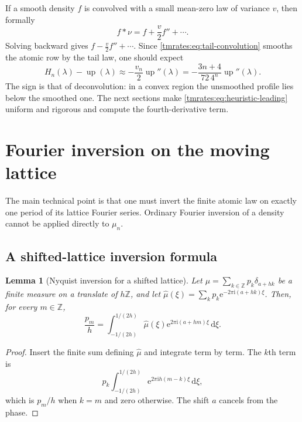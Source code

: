 \documentclass[11pt,oneside]{article}
\newtheorem{lemma}[theorem]{Lemma}
\theoremstyle{definition}
\theoremstyle{remark}
\newcommand{\Z}{\mathbb Z}
\newcommand{\Up}{\operatorname{up}}
\newcommand{\e}{\mathrm e}
\newcommand{\ii}{\mathrm i}
\newcommand{\dd}{\,\mathrm d}
\begin{document}
If a smooth density $f$ is convolved with a small mean-zero law of variance $v$, then formally
\[
 f*\nu=f+\frac v2f''+\cdots.
\]
Solving backward gives $f-\frac v2f''+\cdots$.  Since \eqref{tmrates:eq:tail-convolution} smooths the
atomic row by the tail law, one should expect
\begin{equation}
 H_n(\lambda)-\Up(\lambda)
 \approx-\frac{v_n}{2}\Up''(\lambda)
 =-\frac{3n+4}{72\,4^n}\Up''(\lambda).                    \label{tmrates:eq:heuristic-leading}
\end{equation}
The sign is that of deconvolution: in a convex region the unsmoothed profile lies below the
smoothed one.  The next sections make \eqref{tmrates:eq:heuristic-leading} uniform and rigorous and
compute the fourth-derivative term.

\section{Fourier inversion on the moving lattice}
\label{tmrates:sec:fourier}

The main technical point is that one must invert the finite atomic law on exactly one period
of its lattice Fourier series.  Ordinary Fourier inversion of a density cannot be applied
directly to $\mu_n$.

\subsection{A shifted-lattice inversion formula}

\begin{lemma}[Nyquist inversion for a shifted lattice]
\label{tmrates:lem:lattice-inversion}
Let $\mu=\sum_{k\in\Z}p_k\delta_{a+hk}$ be a finite measure on a translate of $h\Z$, and let
$\widehat\mu(\xi)=\sum_kp_k\e^{-2\pi\ii(a+hk)\xi}$.  Then, for every $m\in\Z$,
\begin{equation}
 \frac{p_m}{h}
 =\int_{-1/(2h)}^{1/(2h)}
   \widehat\mu(\xi)\e^{2\pi\ii(a+hm)\xi}\dd\xi.          \label{tmrates:eq:lattice-inversion}
\end{equation}
\end{lemma}

\begin{proof}
Insert the finite sum defining $\widehat\mu$ and integrate term by term.  The $k$th term is
\[
 p_k\int_{-1/(2h)}^{1/(2h)}\e^{2\pi\ii h(m-k)\xi}\dd\xi,
\]
which is $p_m/h$ when $k=m$ and zero otherwise.  The shift $a$ cancels from the phase.
\end{proof}
\end{document}

